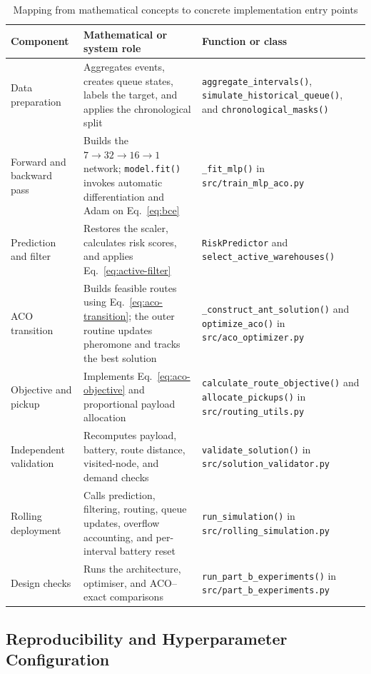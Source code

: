 \documentclass[10pt]{article}
\newcommand{\code}[1]{\nolinkurl{#1}}
\begin{document}
\begin{table}[H]
\centering
\caption{Mapping from mathematical concepts to concrete implementation entry points}
\label{tab:theory-code}
\small
\begin{tabularx}{\textwidth}{p{}Yp{0.36\textwidth}}
\toprule
Component & Mathematical or system role & Function or class \\
\midrule
Data preparation & Aggregates events, creates queue states, labels the target, and applies the chronological split & \code{aggregate_intervals()}, \code{simulate_historical_queue()}, and \code{chronological_masks()} \\
Forward and backward pass & Builds the $7\!\rightarrow\!32\!\rightarrow\!16\!\rightarrow\!1$ network; \code{model.fit()} invokes automatic differentiation and Adam on Eq.~\eqref{eq:bce} & \code{_fit_mlp()} in \code{src/train_mlp_aco.py} \\
Prediction and filter & Restores the scaler, calculates risk scores, and applies Eq.~\eqref{eq:active-filter} & \code{RiskPredictor} and \code{select_active_warehouses()} \\
ACO transition & Builds feasible routes using Eq.~\eqref{eq:aco-transition}; the outer routine updates pheromone and tracks the best solution & \code{_construct_ant_solution()} and \code{optimize_aco()} in \code{src/aco_optimizer.py} \\
Objective and pickup & Implements Eq.~\eqref{eq:aco-objective} and proportional payload allocation & \code{calculate_route_objective()} and \code{allocate_pickups()} in \code{src/routing_utils.py} \\
Independent validation & Recomputes payload, battery, route distance, visited-node, and demand checks & \code{validate_solution()} in \code{src/solution_validator.py} \\
Rolling deployment & Calls prediction, filtering, routing, queue updates, overflow accounting, and per-interval battery reset & \code{run_simulation()} in \code{src/rolling_simulation.py} \\
Design checks & Runs the architecture, optimiser, and ACO--exact comparisons & \code{run_part_b_experiments()} in \code{src/part_b_experiments.py} \\
\bottomrule
\end{tabularx}
\end{table}

\subsection{Reproducibility and Hyperparameter Configuration}
\end{document}
